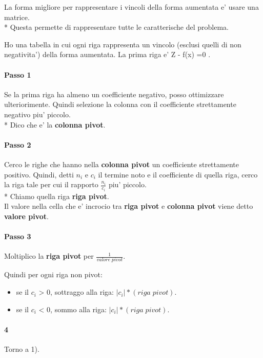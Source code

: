 La forma migliore per rappresentare i vincoli della forma aumentata e' usare una matrice. \\*
Questa permette di rappresentare tutte le caratterische del problema.

Ho una tabella in cui ogni riga rappresenta un vincolo (esclusi quelli di non negativita') della forma aumentata. La prima riga e' Z  - f(x) =0 .

\paragraph{Passo 1}

Se la prima riga ha almeno un coefficiente negativo, posso ottimizzare ulteriorimente.
Quindi selezione la colonna con il coefficiente strettamente negativo piu' piccolo. \\*
Dico che e' la \textbf{colonna pivot}.

\paragraph{Passo 2}

Cerco le righe che hanno nella \textbf{colonna pivot} un coefficiente strettamente positivo.
Quindi, detti $n_i$ e $c_i$ il termine noto e il coefficiente di quella riga, cerco la riga tale per cui il rapporto $\frac {n_i} {c_i}$ piu' piccolo. \\*
Chiamo quella riga \textbf{riga pivot}. \\
Il valore nella cella che e' incrocio tra \textbf{riga pivot} e \textbf{colonna pivot} viene detto \textbf{valore pivot}.

\paragraph{Passo 3}

Moltiplico la \textbf{riga pivot} per $\frac {1} {valore \; pivot}$.

Quindi per ogni riga non pivot:
\begin{itemize}
    \item se il $c_i$ > 0, sottraggo alla riga: $|c_i| * (riga \; pivot)$.
    \item se il $c_i$ < 0, sommo alla riga: $|c_i| * (riga \; pivot)$.
\end{itemize}

\paragraph{4}

Torno a 1).
